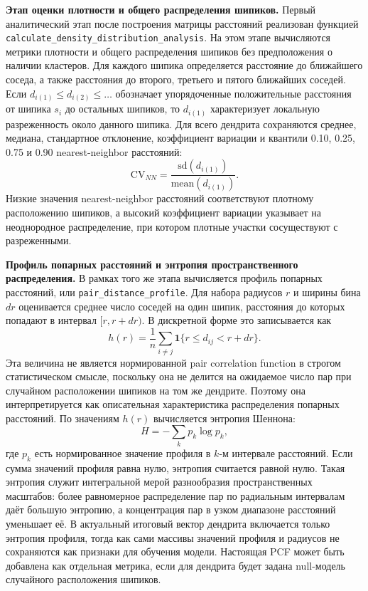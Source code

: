 \documentclass[12pt,a4paper]{article}
\begin{document}
\noindent\textbf{Этап оценки плотности и общего распределения шипиков.}
Первый аналитический этап после построения матрицы расстояний реализован функцией \texttt{calculate\_density\_distribution\_analysis}. На этом этапе вычисляются метрики плотности и общего распределения шипиков без предположения о наличии кластеров. Для каждого шипика определяется расстояние до ближайшего соседа, а также расстояния до второго, третьего и пятого ближайших соседей. Если \(d_{i(1)}\leq d_{i(2)}\leq\ldots\) обозначает упорядоченные положительные расстояния от шипика \(s_i\) до остальных шипиков, то \(d_{i(1)}\) характеризует локальную разреженность около данного шипика. Для всего дендрита сохраняются среднее, медиана, стандартное отклонение, коэффициент вариации и квантили 0.10, 0.25, 0.75 и 0.90 nearest-neighbor расстояний:
\[
\mathrm{CV}_{NN}=\frac{\mathrm{sd}(d_{i(1)})}{\mathrm{mean}(d_{i(1)})}.
\]
Низкие значения nearest-neighbor расстояний соответствуют плотному расположению шипиков, а высокий коэффициент вариации указывает на неоднородное распределение, при котором плотные участки сосуществуют с разреженными.

\noindent\textbf{Профиль попарных расстояний и энтропия пространственного распределения.}
В рамках того же этапа вычисляется профиль попарных расстояний, или \texttt{pair\_distance\_profile}. Для набора радиусов \(r\) и ширины бина \(dr\) оценивается среднее число соседей на один шипик, расстояния до которых попадают в интервал \([r,r+dr)\). В дискретной форме это записывается как
\[
h(r)=\frac{1}{n}\sum_{i\neq j}\mathbf{1}\{r\leq d_{ij}<r+dr\}.
\]
Эта величина не является нормированной pair correlation function в строгом статистическом смысле, поскольку она не делится на ожидаемое число пар при случайном расположении шипиков на том же дендрите. Поэтому она интерпретируется как описательная характеристика распределения попарных расстояний. По значениям \(h(r)\) вычисляется энтропия Шеннона:
\[
H=-\sum_k p_k\log p_k,
\]
где \(p_k\) есть нормированное значение профиля в \(k\)-м интервале расстояний. Если сумма значений профиля равна нулю, энтропия считается равной нулю. Такая энтропия служит интегральной мерой разнообразия пространственных масштабов: более равномерное распределение пар по радиальным интервалам даёт большую энтропию, а концентрация пар в узком диапазоне расстояний уменьшает её. В актуальный итоговый вектор дендрита включается только энтропия профиля, тогда как сами массивы значений профиля и радиусов не сохраняются как признаки для обучения модели. Настоящая PCF может быть добавлена как отдельная метрика, если для дендрита будет задана null-модель случайного расположения шипиков.
\end{document}
